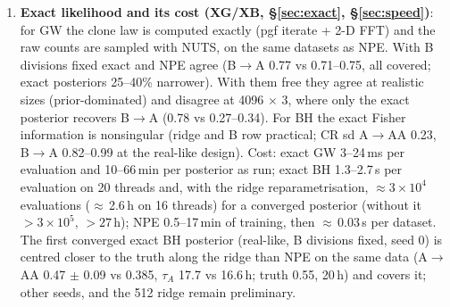 \documentclass[10pt,a4paper]{article}
\newcommand{\tA}{$\tau_A$}
\newcommand{\code}[1]{\texttt{\detokenize{#1}}}
\begin{document}
\begin{enumerate}[leftmargin=1.4em]
\item \textbf{Exact likelihood and its cost (XG/XB, \S\ref{sec:exact}, \S\ref{sec:speed})}: for GW the clone law is computed exactly (pgf iterate + 2-D FFT) and the raw counts are sampled with NUTS, on the same datasets as NPE. With B divisions fixed exact and NPE agree (B$\to$A 0.77 vs 0.71--0.75, all covered; exact posteriors 25--40\% narrower). With them free they agree at realistic sizes (prior-dominated) and disagree at 4096 $\times$ 3, where only the exact posterior recovers B$\to$A (0.78 vs 0.27--0.34). For BH the exact Fisher information is nonsingular (ridge and B row practical; CR sd A$\to$AA 0.23, B$\to$A 0.82--0.99 at the real-like design). Cost: exact GW 3--24\,ms per evaluation and 10--66\,min per posterior as run; exact BH 1.3--2.7\,s per evaluation on 20 threads and, with the ridge reparametrisation, $\approx 3\times10^4$ evaluations ($\approx$\,2.6\,h on 16 threads) for a converged posterior (without it $>3\times10^5$, $>27$\,h); NPE 0.5--17\,min of training, then $\approx$\,0.03\,s per dataset. The first converged exact BH posterior (real-like, B divisions fixed, seed 0) is centred closer to the truth along the ridge than NPE on the same data (A$\to$AA 0.47 $\pm$ 0.09 vs 0.385, \tA{} 17.7 vs 16.6\,h; truth 0.55, 20\,h) and covers it; other seeds, \code{two_type} and the 512 ridge remain preliminary.
\end{enumerate}
\end{document}
